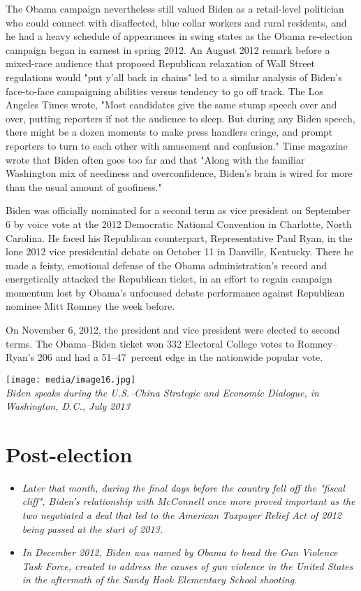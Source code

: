 The Obama campaign nevertheless still valued Biden as a retail-level
politician who could connect with disaffected, blue collar workers and
rural residents, and he had a heavy schedule of appearances in swing
states as the Obama re-election campaign began in earnest in spring
2012. An August 2012 remark before a mixed-race audience that proposed
Republican relaxation of Wall Street regulations would "put y'all back
in chains" led to a similar analysis of Biden's face-to-face campaigning
abilities versus tendency to go off track. The Los Angeles Times wrote,
"Most candidates give the same stump speech over and over, putting
reporters if not the audience to sleep. But during any Biden speech,
there might be a dozen moments to make press handlers cringe, and prompt
reporters to turn to each other with amusement and confusion." Time
magazine wrote that Biden often goes too far and that "Along with the
familiar Washington mix of neediness and overconfidence, Biden's brain
is wired for more than the usual amount of goofiness."

Biden was officially nominated for a second term as vice president on
September 6 by voice vote at the 2012 Democratic National Convention in
Charlotte, North Carolina. He faced his Republican counterpart,
Representative Paul Ryan, in the lone 2012 vice presidential debate on
October 11 in Danville, Kentucky. There he made a feisty, emotional
defense of the Obama administration's record and energetically attacked
the Republican ticket, in an effort to regain campaign momentum lost by
Obama's unfocused debate performance against Republican nominee Mitt
Romney the week before.

On November 6, 2012, the president and vice president were elected to
second terms. The Obama--Biden ticket won 332 Electoral College votes to
Romney--Ryan's 206 and had a 51--47~percent edge in the nationwide
popular vote.

\texttt{[image: media/image16.jpg]}\\
\emph{Biden speaks during the U.S.--China Strategic and Economic
Dialogue, in Washington, D.C., July 2013}

\section{Post-election}\label{post-election}

\begin{itemize}
\item
  \emph{Later that month, during the final days before the country fell
  off the "fiscal cliff", Biden's relationship with McConnell once more
  proved important as the two negotiated a deal that led to the American
  Taxpayer Relief Act of 2012 being passed at the start of 2013.}
\item
  \emph{In December 2012, Biden was named by Obama to head the Gun
  Violence Task Force, created to address the causes of gun violence in
  the United States in the aftermath of the Sandy Hook Elementary School
  shooting.}
\end{itemize}

